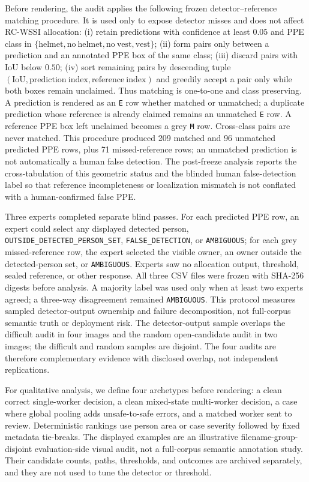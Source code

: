 \documentclass[iicol,pdflatex,sn-mathphys-num]{sn-jnl}
\begin{document}
Before rendering, the audit applies the following frozen detector--reference matching procedure. It is used only to expose detector misses and does not affect RC-WSSI allocation: (i) retain predictions with confidence at least $0.05$ and PPE class in $\{\mathrm{helmet},\mathrm{no\ helmet},\mathrm{no\ vest},\mathrm{vest}\}$; (ii) form pairs only between a prediction and an annotated PPE box of the same class; (iii) discard pairs with IoU below $0.50$; (iv) sort remaining pairs by descending tuple $(\mathrm{IoU},\mathrm{prediction\ index},\mathrm{reference\ index})$ and greedily accept a pair only while both boxes remain unclaimed. Thus matching is one-to-one and class preserving. A prediction is rendered as an \texttt{E} row whether matched or unmatched; a duplicate prediction whose reference is already claimed remains an unmatched \texttt{E} row. A reference PPE box left unclaimed becomes a grey \texttt{M} row. Cross-class pairs are never matched. This procedure produced 209 matched and 96 unmatched predicted PPE rows, plus 71 missed-reference rows; an unmatched prediction is not automatically a human false detection. The post-freeze analysis reports the cross-tabulation of this geometric status and the blinded human false-detection label so that reference incompleteness or localization mismatch is not conflated with a human-confirmed false PPE.

Three experts completed separate blind passes. For each predicted PPE row, an expert could select any displayed detected person, \texttt{OUTSIDE\_DETECTED\_PERSON\_SET}, \texttt{FALSE\_DETECTION}, or \texttt{AMBIGUOUS}; for each grey missed-reference row, the expert selected the visible owner, an owner outside the detected-person set, or \texttt{AMBIGUOUS}. Experts saw no allocation output, threshold, sealed reference, or other response. All three CSV files were frozen with SHA-256 digests before analysis. A majority label was used only when at least two experts agreed; a three-way disagreement remained \texttt{AMBIGUOUS}. This protocol measures sampled detector-output ownership and failure decomposition, not full-corpus semantic truth or deployment risk. The detector-output sample overlaps the difficult audit in four images and the random open-candidate audit in two images; the difficult and random samples are disjoint. The four audits are therefore complementary evidence with disclosed overlap, not independent replications.

For qualitative analysis, we define four archetypes before rendering: a clean correct single-worker decision, a clean mixed-state multi-worker decision, a case where global pooling adds unsafe-to-safe errors, and a matched worker sent to review. Deterministic rankings use person area or case severity followed by fixed metadata tie-breaks. The displayed examples are an illustrative filename-group-disjoint evaluation-side visual audit, not a full-corpus semantic annotation study. Their candidate counts, paths, thresholds, and outcomes are archived separately, and they are not used to tune the detector or threshold.
\end{document}
